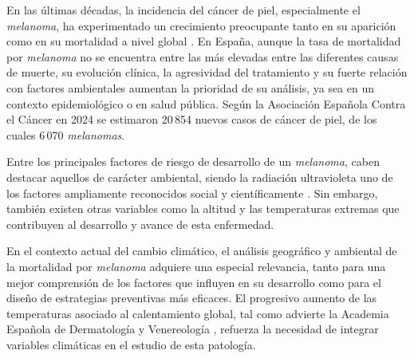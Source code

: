 En las últimas décadas, la incidencia del cáncer de piel, especialmente el \textit{melanoma}, ha experimentado un crecimiento preocupante tanto en su aparición como en su mortalidad a nivel global \cite{gutierrez_2019trends}.  En España, aunque la tasa de mortalidad por \textit{melanoma} no se encuentra entre las más elevadas entre las diferentes causas de muerte, su evolución clínica, la agresividad del tratamiento y su fuerte relación con factores ambientales aumentan la prioridad de su análisis, ya sea en un contexto epidemiológico o en salud pública. Según la Asociación Española Contra el Cáncer \cite{CancerPielPresentaciona} en 2024 se estimaron 20\,854 nuevos casos de cáncer de piel, de los cuales 6\,070 \textit{melanomas}. 

Entre los principales factores de riesgo de desarrollo de un \textit{melanoma}, caben destacar aquellos de carácter ambiental, siendo la radiación ultravioleta uno de los factores ampliamente reconocidos social y científicamente \cite{boz_Prospective_Cohort_Analysis2022a}. Sin embargo, también existen otras variables como la altitud \cite{del_fiore_Altitude_Effect_Cutaneous2022a}  y las temperaturas extremas \cite{miller_Heat2024} que contribuyen al desarrollo y avance de esta enfermedad. 

En el contexto actual del cambio climático, el análisis geográfico y ambiental de la mortalidad por \textit{melanoma} adquiere una especial relevancia, tanto para una mejor comprensión de los factores que influyen en su desarrollo como para el diseño de estrategias preventivas más eficaces. El progresivo aumento de las temperaturas asociado al calentamiento global, tal como advierte la Academia Española de Dermatología y Venereología \cite{CambioClimaticoCancer2015}, refuerza la necesidad de integrar variables climáticas en el estudio de esta patología.



